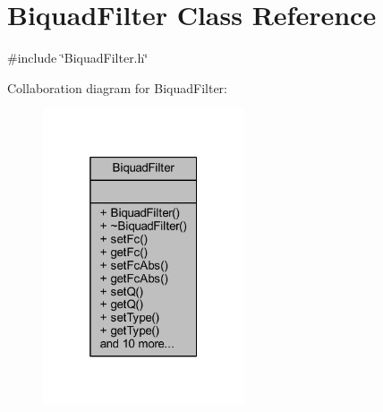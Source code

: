 \hypertarget{class_biquad_filter}{}\section{Biquad\+Filter Class Reference}
\label{class_biquad_filter}


{\ttfamily \#include \char`\"{}Biquad\+Filter.\+h\char`\"{}}



Collaboration diagram for Biquad\+Filter\+:
\nopagebreak
\begin{figure}[H]
\begin{center}
\leavevmode
\includegraphics[width=169pt]{df/d1e/class_biquad_filter__coll__graph}
\end{center}
\end{figure}
